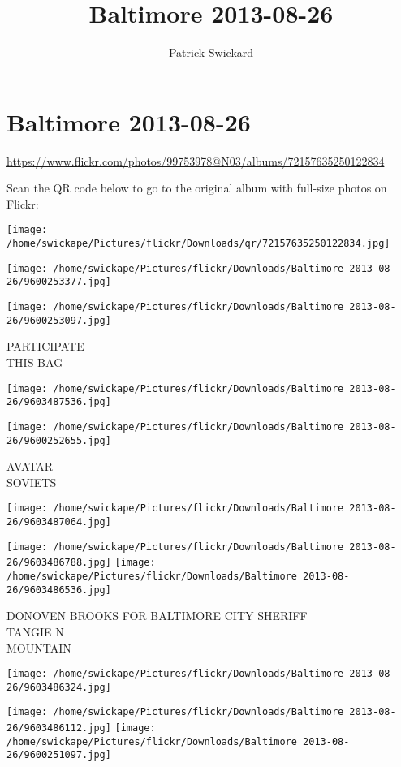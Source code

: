 \documentclass[10pt,letterpaper]{article}
\title{Baltimore 2013-08-26}
\author{Patrick Swickard}
\date{}
\begin{document}
\section*{Baltimore 2013-08-26}

\url{https://www.flickr.com/photos/99753978@N03/albums/72157635250122834}

Scan the QR code below to go to the original album with full-size photos on Flickr:

\texttt{[image: /home/swickape/Pictures/flickr/Downloads/qr/72157635250122834.jpg]}
\pagebreak

\texttt{[image: /home/swickape/Pictures/flickr/Downloads/Baltimore 2013-08-26/9600253377.jpg]}

\vspace{0.25in}
\texttt{[image: /home/swickape/Pictures/flickr/Downloads/Baltimore 2013-08-26/9600253097.jpg]}

PARTICIPATE\\
THIS BAG
\pagebreak

\texttt{[image: /home/swickape/Pictures/flickr/Downloads/Baltimore 2013-08-26/9603487536.jpg]}

\vspace{0.25in}
\texttt{[image: /home/swickape/Pictures/flickr/Downloads/Baltimore 2013-08-26/9600252655.jpg]}

AVATAR\\
SOVIETS
\pagebreak

\texttt{[image: /home/swickape/Pictures/flickr/Downloads/Baltimore 2013-08-26/9603487064.jpg]}

\vspace{0.25in}
\texttt{[image: /home/swickape/Pictures/flickr/Downloads/Baltimore 2013-08-26/9603486788.jpg]}
\texttt{[image: /home/swickape/Pictures/flickr/Downloads/Baltimore 2013-08-26/9603486536.jpg]}

DONOVEN BROOKS FOR BALTIMORE CITY SHERIFF\\
TANGIE N\\
MOUNTAIN
\pagebreak

\texttt{[image: /home/swickape/Pictures/flickr/Downloads/Baltimore 2013-08-26/9603486324.jpg]}

\vspace{0.25in}
\texttt{[image: /home/swickape/Pictures/flickr/Downloads/Baltimore 2013-08-26/9603486112.jpg]}
\texttt{[image: /home/swickape/Pictures/flickr/Downloads/Baltimore 2013-08-26/9600251097.jpg]}
\end{document}
